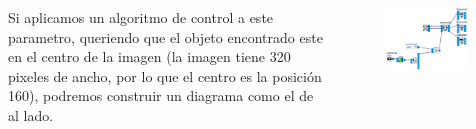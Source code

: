 \begin{frame}
	\begin{columns}
		Si aplicamos un algoritmo de control a este parametro, queriendo que el objeto encontrado este en el centro de la imagen (la imagen tiene 320 pixeles de ancho, por lo que el centro es la posición 160), podremos construir un diagrama como el de al lado.

		\begin{figure}
			\begin{center}
				\includegraphics[width=0.95\textwidth]{images/01-vision-artificial/12.png}
			\end{center}
		\end{figure}
	\end{columns}
\end{frame}

